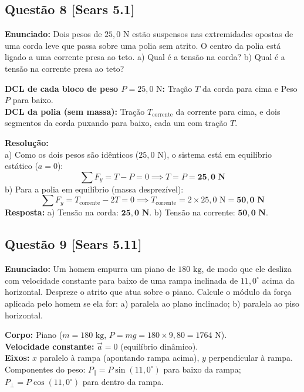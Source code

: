 \documentclass[11pt,a4paper]{article}
\begin{document}
\vspace{0.3cm}
\subsection*{Questão 8 [Sears 5.1]}
\textbf{Enunciado:} Dois pesos de $25,0\text{ N}$ estão suspensos nas extremidades opostas de uma corda leve que passa sobre uma polia sem atrito. O centro da polia está ligado a uma corrente presa ao teto. a) Qual é a tensão na corda? b) Qual é a tensão na corrente presa ao teto?

\begin{dclbox}
\textbf{DCL de cada bloco de peso $P = 25,0\text{ N}$:} Tração $T$ da corda para cima e Peso $P$ para baixo.\\
\textbf{DCL da polia (sem massa):} Tração $T_{\text{corrente}}$ da corrente para cima, e dois segmentos da corda puxando para baixo, cada um com tração $T$.
\end{dclbox}

\noindent
\textbf{Resolução:}\\
a) Como os dois pesos são idênticos ($25,0\text{ N}$), o sistema está em equilíbrio estático ($a = 0$):
\[ \sum F_y = T - P = 0 \implies T = P = \mathbf{25,0\text{ N}} \]
b) Para a polia em equilíbrio (massa desprezível):
\[ \sum F_y = T_{\text{corrente}} - 2T = 0 \implies T_{\text{corrente}} = 2 \times 25,0\text{ N} = \mathbf{50,0\text{ N}} \]
\textbf{Resposta:} a) Tensão na corda: $\mathbf{25,0\text{ N}}$. b) Tensão na corrente: $\mathbf{50,0\text{ N}}$.

\vspace{0.3cm}
\subsection*{Questão 9 [Sears 5.11]}
\textbf{Enunciado:} Um homem empurra um piano de $180\text{ kg}$, de modo que ele desliza com velocidade constante para baixo de uma rampa inclinada de $11,0^\circ$ acima da horizontal. Despreze o atrito que atua sobre o piano. Calcule o módulo da força aplicada pelo homem se ela for: a) paralela ao plano inclinado; b) paralela ao piso horizontal.

\begin{dclbox}
\textbf{Corpo:} Piano ($m = 180\text{ kg}$, $P = mg = 180 \times 9,80 = 1764\text{ N}$).\\
\textbf{Velocidade constante:} $\vec{a} = 0$ (equilíbrio dinâmico).\\
\textbf{Eixos:} $x$ paralelo à rampa (apontando rampa acima), $y$ perpendicular à rampa.\\
Componentes do peso: $P_\parallel = P\sin(11,0^\circ)$ para baixo da rampa; $P_\perp = P\cos(11,0^\circ)$ para dentro da rampa.
\end{dclbox}
\end{document}
